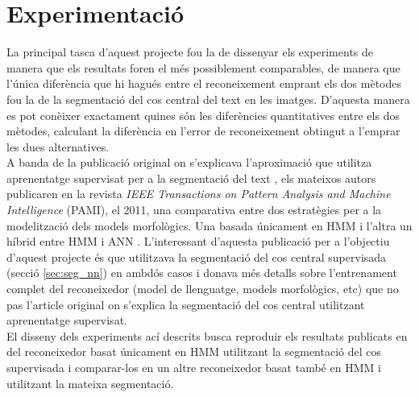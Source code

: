 \chapter{Experimentació} 
\label{cap:exp}
La principal tasca d'aquest projecte fou la de dissenyar els experiments de manera que els resultats foren el més possiblement comparables, de manera que l'única diferència que hi hagués entre el reconeixement emprant els dos mètodes fou la de la segmentació del cos central del text en les imatges. D'aquesta manera es pot conèixer exactament quines són les diferències quantitatives entre els dos mètodes, calculant la diferència en l'error de reconeixement obtingut a l'emprar les dues alternatives.\\

A banda de la publicació original on s'explicava l'aproximació que utilitza aprenentatge supervisat per a la segmentació del text \cite{DBLP:conf/pris/Gorbe-MoyaEZB08}, els mateixos autors publicaren en la revista \emph{IEEE Transactions on Pattern Analysis and Machine Intelligence} (PAMI), el 2011, una comparativa entre dos estratègies per a la modelització dels models morfològics. Una basada únicament en HMM i l'altra un híbrid entre HMM i ANN \cite{espana2011improving}. L'interessant d'aquesta publicació per a l'objectiu d'aquest projecte és que utilitzava la segmentació del cos central supervisada (secció \ref{sec:seg_nn}) en ambdós casos i donava més detalls sobre l'entrenament complet del reconeixedor (model de llenguatge, models morfològics, etc) que no pas l'article original on s'explica la segmentació del cos central utilitzant aprenentatge supervisat.\\

El disseny dels experiments ací descrits busca reproduir els resultats publicats en \cite{espana2011improving} del reconeixedor basat únicament en HMM utilitzant la segmentació del cos supervisada i comparar-los en un altre reconeixedor basat també en HMM i utilitzant la mateixa segmentació.

